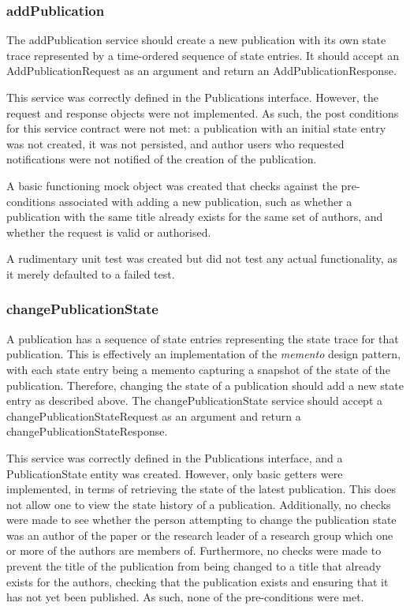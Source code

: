 \documentclass[a4paper,10pt]{article}
\begin{document}
\subsubsection{addPublication}
The addPublication service should create a new publication with its own state trace represented by a time-ordered sequence of state entries. It should accept an AddPublicationRequest as an argument and return an AddPublicationResponse.

This service was correctly defined in the Publications interface. However, the request and response objects were not implemented. As such, the post conditions for this service contract were not met: a publication with an initial state entry was not created, it was not persisted, and author users who requested notifications were not notified of the creation of the publication.

A basic functioning mock object was created that checks against the pre-conditions associated with adding a new publication, such as whether a publication with the same title already exists for the same set of authors, and whether the request is valid or authorised.

A rudimentary unit test was created but did not test any actual functionality, as it merely defaulted to a failed test.

\subsubsection{changePublicationState}
A publication has a sequence of state entries representing the state trace for that publication. This is effectively an implementation of the \textit{memento} design pattern, with each state entry being a memento capturing a snapshot of the state of the publication. Therefore, changing the state of a publication should add a new state entry as described above. The changePublicationState service should accept a changePublicationStateRequest as an argument and return a changePublicationStateResponse.

This service was correctly defined in the Publications interface, and a PublicationState entity was created. However, only basic getters were implemented, in terms of retrieving the state of the latest publication. This does not allow one to view the state history of a publication. Additionally, no checks were made to see whether the person attempting to change the publication state was an author of the paper or the research leader of a research group which one or more of the authors are members of. Furthermore, no checks were made to prevent the title of the publication from being changed to a title that already exists for the authors, checking that the publication exists and ensuring that it has not yet been published. As such, none of the pre-conditions were met.
\end{document}
